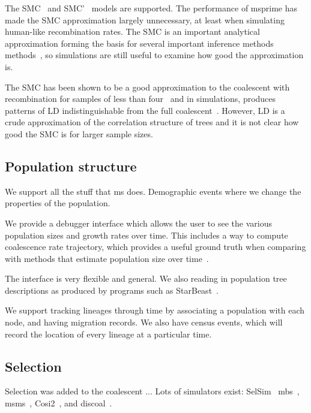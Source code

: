 \documentclass{article}
\begin{document}
The SMC~\citep{mcvean2005approximating} and SMC'~\citep{marjoram2006fast}
models are supported.
The performance of msprime has made the SMC
approximation largely unnecessary, at least when simulating human-like
recombination rates. The SMC is an important analytical approximation
forming the basis for several important inference methods
methods~\citep{
li2011inference,
harris2013inferring,
sheehan2013estimating,
schiffels2014inferring,
carmi2014renewal,
rasmussen2014genome,
zheng2014bayesian,
terhorst2017robust},
so simulations are still useful to examine  how good the approximation
is.

The SMC has been shown to be a good approximation to the
coalescent with recombination for samples of less than
four~\citep{hobolth2014markovian,wilton2015smc}
and in simulations, produces patterns of LD indistinguishable from the
full coalescent~\citep{mcvean2005approximating,marjoram2006fast}. However,
LD is a crude approximation of the correlation structure of trees
and it is not clear how good the SMC is for larger sample sizes.

\subsection*{Population structure}
We support all the stuff that ms does.
Demographic events where we change
the properties of the population.

We provide a debugger interface which allows the user to see the
various population sizes and growth rates over time. This includes
a way to compute coalescence rate trajectory, which provides a useful
ground truth when comparing with methods that estimate population
size over time~\citep{adrion2019community}.

The interface
is very flexible and general. We also reading in population tree
descriptions as produced by programs such as
StarBeast~\citep{heled2009bayesian}.

We support tracking lineages through time by associating a population
with each node, and having migration records. We also have
census events, which will record the location of every lineage
at a particular time.

\subsection*{Selection}
Selection was added to the coalescent ... Lots of simulators exist:
SelSim~\citep{spencer2004selsim}
mbs~\citep{teshima2009mbs},
msms~\citep{ewing2010msms},
Cosi2~\citep{shlyakhter2014cosi2},
and discoal~\citep{kern2016discoal}.
\end{document}
